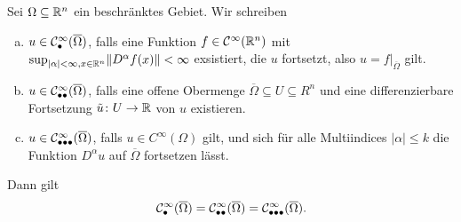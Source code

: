 \begin{lem}
  Sei $\Omega \subseteq \mathbb{R}^n$ ein beschränktes Gebiet.
  Wir schreiben
  \begin{enumerate}[(a)]
    \item $u \in \mathcal{C}^\infty_\bullet(\overline\Omega)$,
  falls eine Funktion $f \in \mathcal{C}^\infty(\mathbb{R}^n)$ mit $\sup_{|\alpha| < \infty, x \in \mathbb{R}^n} \lVert D^\alpha f(x) \rVert <  \infty$ exsistiert, die $u$ fortsetzt, also $u = f|_{\overline\Omega}$ gilt.
    \item $u \in \mathcal{C}^\infty_{\bullet\bullet}(\overline\Omega)$,
  falls eine offene Obermenge $\overline\Omega \subseteq U \subseteq R^n$ und eine differenzierbare Fortsetzung $\tilde u \colon U \to \mathbb{R}$ von $u$ existieren.
  \item $ u \in \mathcal{C}^\infty_{\bullet\bullet\bullet}(\overline\Omega)$,
  falls $u \in C^\infty(\Omega)$ gilt, und sich für alle Multiindices $|\alpha|\leq k$ die Funktion $D^\alpha u$ auf $\overline\Omega$ fortsetzen lässt.
  \end{enumerate}

  Dann gilt
  $$
    \mathcal{C}^\infty_{\bullet}(\overline\Omega) =
    \mathcal{C}^\infty_{\bullet\bullet}(\overline\Omega) =
    \mathcal{C}^\infty_{\bullet\bullet\bullet}(\overline\Omega).
  $$
\end{lem}

